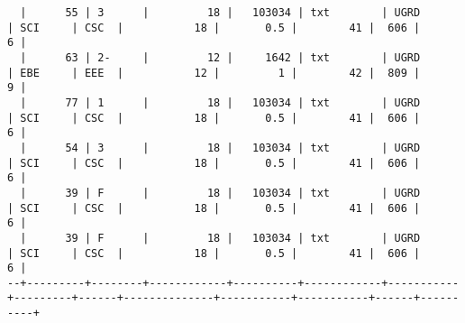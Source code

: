 \begin{sidewaysfigure}
\begin{mdframed}[topline=false,rightline=false,leftline=false]
\begin{BVerbatim}
  |      55 | 3      |         18 |   103034 | txt        | UGRD      | SCI     | CSC  |           18 |       0.5 |        41 |  606 |        6 |
  |      63 | 2-     |         12 |     1642 | txt        | UGRD      | EBE     | EEE  |           12 |         1 |        42 |  809 |        9 |
  |      77 | 1      |         18 |   103034 | txt        | UGRD      | SCI     | CSC  |           18 |       0.5 |        41 |  606 |        6 |
  |      54 | 3      |         18 |   103034 | txt        | UGRD      | SCI     | CSC  |           18 |       0.5 |        41 |  606 |        6 |
  |      39 | F      |         18 |   103034 | txt        | UGRD      | SCI     | CSC  |           18 |       0.5 |        41 |  606 |        6 |
  |      39 | F      |         18 |   103034 | txt        | UGRD      | SCI     | CSC  |           18 |       0.5 |        41 |  606 |        6 |
--+---------+--------+------------+----------+------------+-----------+---------+------+--------------+-----------+-----------+------+----------+
\end{BVerbatim}
  \end{mdframed}
  \caption[Grades data sample]{\textbf{Figure \ref{fig-sample-grades}: Grades data sample}}
  \label{fig-sample-grades}
\end{sidewaysfigure}
